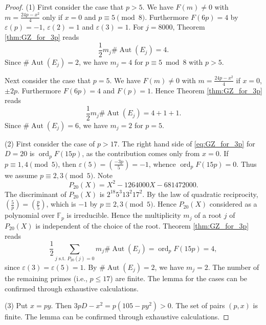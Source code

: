 \documentclass[10pt,a4paper]{amsart}
\newcommand{\Aut}{{\operatorname{Aut}}}
\newcommand{\ord}{{\operatorname{ord}}}
\begin{document}
\begin{proof}
(1) First consider the case that $p>5$.
We have $F(m) \ne 0$ with $m=\frac{24p-x^2}{4}$ only if $x=0$
and $p\equiv 5 \pmod 8$. Furthermore $F(6p) = 4$ by $\varepsilon(p)=-1$, $\varepsilon(2)=1$ and $\varepsilon(3)=1$. 
For $j=8000$, Theorem \ref{thm:GZ_for_3p} reads
\[
\frac{1}{2} m_j \# \Aut(E_j) = 4.
\]
Since $\# \Aut(E_j) = 2$,
we have $m_j = 4$ for $p\equiv 5 \bmod 8$ with $p > 5$.

Next consider the case that $p=5$.
We have $F(m)\ne 0$ with $m=\frac{24p-x^2}{4}$ if $x=0$, $\pm 2p$.
Furthermore $F(6p) = 4$ and $F(p) = 1$. Hence
Theorem \ref{thm:GZ_for_3p} reads
\[
\frac{1}{2} m_j \# \Aut(E_j) = 4+1+1.
\]
Since $\# \Aut(E_j) = 6$,
we have $m_j = 2$ for $p=5$.

(2) 
First consider the case of $p>17$.
The right hand side of \eqref{eq:GZ_for_3p} for $D=20$ is $\ord_p F(15p)$,
as the contribution comes only from $x=0$.
If $p \equiv 1,4 \pmod 5$, then $\varepsilon(5)=\left(\frac{-3p}{5}\right)=-1$,
whence $\ord_p F(15p)=0$. Thus we assume $p \equiv 2,3 \pmod 5$.
Note
\[
P_{20}(X)=X^2 - 1264000X - 681472000.
\]
The discriminant of $P_{20}(X)$ is $2^{18} 5^3 13^2 17^2$.
By the law of quadratic reciprocity, $\displaystyle \left(\frac{5}{p}\right) = \left(\frac{p}{5}\right)$, which is $-1$ by $p \equiv 2,3 \pmod 5$. Hence
$P_{20}(X)$ considered as a polynomial over ${\mathbb F}_p$ is irreducible. %
Hence the multiplicity $m_j$ of a root $j$ of $P_{20}(X)$ is independent of the choice of the root. Theorem \ref{thm:GZ_for_3p} reads
\[
\frac{1}{2} \sum_{j \text{ s.t. } P_{20}(j)=0} m_j \# \Aut(E_j) = \ord_p F(15p) = 4,
\]
since $\varepsilon(3)=\varepsilon(5)=1$. By $\# \Aut(E_j)=2$,
we have $m_j = 2$. The number of the remaining primes (i.e., $p\le 17$) are finite. The lemma for the cases can be confirmed through exhaustive calculations.

(3) Put $x=py$. Then $3pD-x^2 = p(105-py^2)>0$. The set of pairs $(p,x)$ is finite. The lemma
can be confirmed through exhaustive calculations.
\end{proof}
\end{document}
